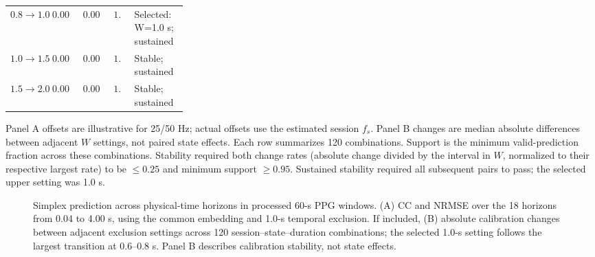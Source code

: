 \begin{table}[p]
\begin{tabular}{lrrc>{\raggedright\arraybackslash}p{0.30\linewidth}}
$0.8 \to 1.0$ & $0.003605$ & $0.003260$ & $1.00$ & Selected: W=1.0 s; sustained \\
$1.0 \to 1.5$ & $0.008894$ & $0.007937$ & $1.00$ & Stable; sustained \\
$1.5 \to 2.0$ & $0.007034$ & $0.006442$ & $1.00$ & Stable; sustained \\
\bottomrule
\end{tabular}
\par\smallskip
\begin{minipage}{0.98\linewidth}
\footnotesize Panel A offsets are illustrative for 25/50 Hz; actual offsets use the estimated session $f_s$. Panel B changes are median absolute differences between adjacent $W$ settings, not paired state effects. Each row summarizes 120 combinations. Support is the minimum valid-prediction fraction across these combinations. Stability required both change rates (absolute change divided by the interval in $W$, normalized to their respective largest rate) to be $\leq0.25$ and minimum support $\geq0.95$. Sustained stability required all subsequent pairs to pass; the selected upper setting was 1.0 s.
\end{minipage}
\end{table}

\begin{figure}[p]
\centering
\caption{Simplex prediction across physical-time horizons in processed 60-s PPG windows. (A) CC and NRMSE over the 18 horizons from 0.04 to 4.00 s, using the common embedding and 1.0-s temporal exclusion. If included, (B) absolute calibration changes between adjacent exclusion settings across 120 session--state--duration combinations; the selected 1.0-s setting follows the largest transition at 0.6--0.8 s. Panel B describes calibration stability, not state effects.}
\label{fig:supp_simplex}
\end{figure}

